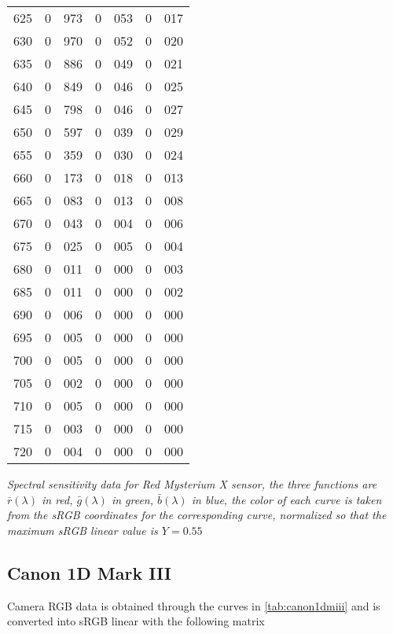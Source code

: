 {{\begin{minipage}{.3\textwidth}
\begin{tabular}{c|r@{.}l | r@{.}l | r@{.}l}
 625 &   0&973 &   0&053 &   0&017 \\
 630 &   0&970 &   0&052 &   0&020 \\
 635 &   0&886 &   0&049 &   0&021 \\
 640 &   0&849 &   0&046 &   0&025 \\
 645 &   0&798 &   0&046 &   0&027 \\
 650 &   0&597 &   0&039 &   0&029 \\
 655 &   0&359 &   0&030 &   0&024 \\
 660 &   0&173 &   0&018 &   0&013 \\
 665 &   0&083 &   0&013 &   0&008 \\
 670 &   0&043 &   0&004 &   0&006 \\
 675 &   0&025 &   0&005 &   0&004 \\
 680 &   0&011 &   0&000 &   0&003 \\
 685 &   0&011 &   0&000 &   0&002 \\
 690 &   0&006 &   0&000 &   0&000 \\
 695 &   0&005 &   0&000 &   0&000 \\
 700 &   0&005 &   0&000 &   0&000 \\
 705 &   0&002 &   0&000 &   0&000 \\
 710 &   0&005 &   0&000 &   0&000 \\
 715 &   0&003 &   0&000 &   0&000 \\
 720 &   0&004 &   0&000 &   0&000 \\
\end{tabular}
\end{minipage}

\vskip 1mm
}
\centering
{\footnotesize\it Spectral sensitivity data for Red Mysterium X sensor, the
three functions
are $\bar r(\lambda)$ in red, $\bar g(\lambda)$ in green, $\bar b(\lambda)$ in blue,
the color of each curve is taken from the \gls{sRGB} coordinates for the
corresponding
curve, normalized so that the maximum \gls{sRGB} linear value is $Y = 0.55$
}
\label{tab:redmysteriumx}
}

\newpage

\subsection{Canon 1D Mark III}

Camera \gls{RGB} data is obtained through the curves in
\cref{tab:canon1dmiii} and is converted into
\gls{sRGB} linear with the following matrix

